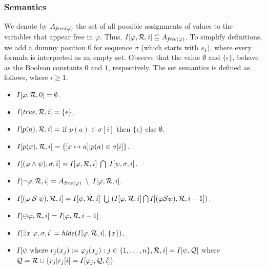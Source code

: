 \subsubsection{Semantics}

We denote by $A_{\mathit{free} ( \varphi )}$ the set of all possible assignments
of values to the variables that appear free
in $\varphi$. Thus,
$I [ \varphi, {\cal R} , i] \subseteq A_{\mathit{free} ( \varphi )}$.
To simplify definitions, we add
a dummy position $0$ for sequence $\sigma$ (which starts with $s_1$), 
where every formula is interpreted as an empty set.
Observe that the value $\emptyset$ and $\{ \epsilon \}$, behave
as the Boolean constants $0$ and $1$, respectively.
The set semantics is defined as follows, where $i \ge 1$.



\begin{itemize}
\item $I [ \varphi , {\cal R} , 0 ] = \emptyset$.
\item $I [ \mathit{true} , {\cal R} , i ] = \{ \epsilon \}$.
\item $I [ p ( a ) , {\cal R} , i ] =$ if $p ( a ) \in \sigma [ i ]$ then
$\{ \epsilon \}$ else $\emptyset$.
\item $I [ p ( x ) , {\cal R} , i ] = \{ [ x \mapsto a ] | p ( a ) \in
\sigma [ i ] \}$.
\item $I [ ( \varphi \wedge \psi ) , \sigma , i ] = 
I [ \varphi , {\cal R} , i ] \;  \bigcap \; I [ \psi , \sigma , i ]$.
\item $I [ \neg \varphi , {\cal R} , i ] = 
A_{\mathit{free} ( \varphi )} \; \setminus \; I [ \varphi , {\cal R} , i ]$.
\item $I [ ( \varphi \; {\cal S} \; \psi ) , {\cal R} , i ] = 
I [ \psi , {\cal R}, i ] \; \bigcup \;
( I [ \varphi , {\cal R} , i ] \bigcap 
I [ (\varphi {\cal S} \psi ) , {\cal R} , i - 1 ] )$.
\item $I [ \ominus \varphi , {\cal R} , i ] = I [ \varphi , {\cal R} , i-1 ]$.
\item $I [ \exists x \; \varphi , \sigma , i ] = 
\mathit{hide} ( I [ \varphi , {\cal R} , i ] , \{ x \} )$.
\item $I [ \psi \mathrm{\ where\ } r_j ( x_j) := 
\varphi_j (x_j) : j \in \{ 1 , \ldots , n \} , {\cal R} , i ] = 
 I [ \psi , {\cal Q} ] $ where ${\cal Q} = {\cal R} \cup
\{ r_j | r_j [ i ] =  I [ 
\varphi_j , {\cal Q} , i ] \}$
\end{itemize}

